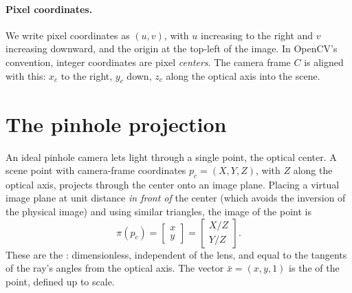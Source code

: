 \paragraph{Pixel coordinates.} We write pixel coordinates as $(u, v)$, with $u$ increasing to the right and $v$ increasing downward, and the origin at the
top-left of the image. In OpenCV's convention, integer coordinates are pixel \emph{centers}. The camera frame $C$ is aligned with this: $x_c$ to the right, $y_c$
down, $z_c$ along the optical axis into the scene.

\section{The pinhole projection}

An ideal pinhole camera lets light through a single point, the optical center. A scene point with camera-frame coordinates $p_c = (X, Y, Z)$, with $Z$ along the
optical axis, projects through the center onto an image plane. Placing a virtual image plane at unit distance \emph{in front of} the center (which avoids
the inversion of the physical image) and using similar triangles, the image of the point is
\begin{equation}
  \pi(p_c) = \begin{bmatrix} x \\ y \end{bmatrix} = \begin{bmatrix} X/Z \\ Y/Z \end{bmatrix}.
  \label{eq:pinhole}
\end{equation}
These are the : dimensionless, independent of the lens, and equal to the tangents of the ray's angles from the optical axis.
The vector $\bar x = (x, y, 1)$ is the  of the point, defined up to scale.

